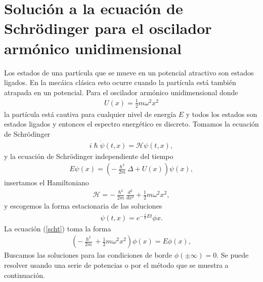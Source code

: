 \documentclass[letterpaper,12pt,oneside]{book}
\begin{document}
\section{Soluci\'on a la ecuaci\'on de Schr\"odinger para el oscilador arm\'onico unidimensional}
Los estados de una part\'icula que se mueve en un potencial atractivo son estados ligados. En la mec\'aica cl\'asica esto ocurre cuando la part\'icula est\'a tambi\'en atrapada en un potencial. 
Para el oscilador arm\'onico unidimensional donde 
%
\begin{eqnarray}
U(x)=\frac{1}{2}m\omega^2x^2  
\end{eqnarray}
%
la part\'icula est\'a cautiva para cualquier nivel de energ\'ia $E$ y todos los estados son estados ligados y entonces el espectro energ\'etico es discreto. Tomamos la ecuaci\'on de Schr\"odinger
%
\begin{eqnarray}
i\hslash\dot\psi(t,x)=\mathcal{H}\psi(t,x),
\end{eqnarray}
%
y la ecuaci\'on de Schr\"odinger independiente del tiempo
%
\begin{eqnarray}
E\psi(x)=\left( -\frac{\hslash^2}{2m}\Delta + U(x) \right)\psi(x),\label{scht}
\end{eqnarray}
%
insertamos el Hamiltoniano 
%
\begin{eqnarray}
\mathcal{H}=-\frac{\hslash^2}{2m}\frac{d^2}{dx^2}+\frac{1}{2}m\omega^2x^2,
\end{eqnarray}
%
y escogemos la forma estacionaria de las soluciones
%
\begin{eqnarray}
\psi(t,x)=e^{-\frac{i}{\hslash}Et}\phi{x}.
\end{eqnarray}
%
La ecuaci\'on (\ref{scht}) toma la forma 
%
\begin{eqnarray}
\left(-\frac{\hslash^2}{2m}+\frac{1}{2}m\omega^2 x^2\right)\phi(x)=E\phi(x),
\end{eqnarray}
%
Buscamos las soluciones para las condiciones de borde $\phi(\pm \infty)=0$. Se puede resolver usando una serie de potencias o por el m\'etodo que se muestra a continuaci\'on.
\end{document}
